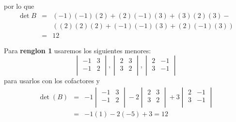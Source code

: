 \documentclass[12pt]{article}
\begin{document}
\begin{multicols}{2}
\begin{enumerate}[A.]
		por lo que 
			\begin{eqnarray*}	
				\det{B} &=& (-1)(-1)(2) + (2)(-1)(3) + (3)(2)(3) - \\ & &(  
							(2)(2)(2) + (-1)(-1)(3) + (2)(-1)(3) ) \\
						&=& 12
			\end{eqnarray*}
			
		Para \textbf{renglon 1} usaremos los siguientes menores:
			$$\begin{vmatrix}
				 -1 &  3 \\
				 -1 &  2 \\
			\end{vmatrix},
			\begin{vmatrix}
				 2 &  3 \\
				 3 &  2 \\
			\end{vmatrix},
			\begin{vmatrix}
				 2 & -1 \\
				 3 & -1 \\
			\end{vmatrix}$$
		para usarlos con los cofactores y
			\begin{eqnarray*}
				\det(B) &=&
					-1 \begin{vmatrix}
						 -1 &  3 \\
						 -1 &  2 \\
					\end{vmatrix} -
					2 \begin{vmatrix}
						 2 &  3 \\
						 3 &  2 \\
					\end{vmatrix} +
					3 \begin{vmatrix}
						 2 & -1 \\
						 3 & -1 \\
					\end{vmatrix} \\
					&=& -1(1) - 2(-5) + 3 = 12
			\end{eqnarray*}
			

\end{enumerate}
\end{multicols}
\end{document}

